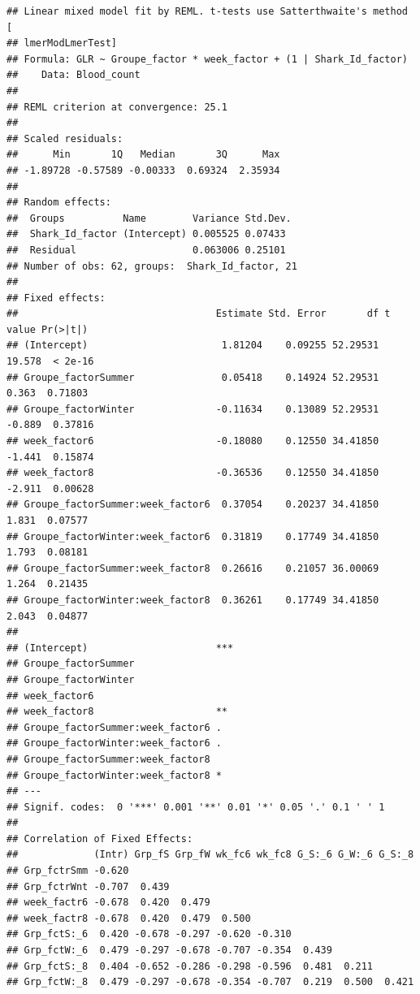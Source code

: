 \documentclass[
]{article}
\begin{document}
\begin{verbatim}
## Linear mixed model fit by REML. t-tests use Satterthwaite's method [
## lmerModLmerTest]
## Formula: GLR ~ Groupe_factor * week_factor + (1 | Shark_Id_factor)
##    Data: Blood_count
## 
## REML criterion at convergence: 25.1
## 
## Scaled residuals: 
##      Min       1Q   Median       3Q      Max 
## -1.89728 -0.57589 -0.00333  0.69324  2.35934 
## 
## Random effects:
##  Groups          Name        Variance Std.Dev.
##  Shark_Id_factor (Intercept) 0.005525 0.07433 
##  Residual                    0.063006 0.25101 
## Number of obs: 62, groups:  Shark_Id_factor, 21
## 
## Fixed effects:
##                                  Estimate Std. Error       df t value Pr(>|t|)
## (Intercept)                       1.81204    0.09255 52.29531  19.578  < 2e-16
## Groupe_factorSummer               0.05418    0.14924 52.29531   0.363  0.71803
## Groupe_factorWinter              -0.11634    0.13089 52.29531  -0.889  0.37816
## week_factor6                     -0.18080    0.12550 34.41850  -1.441  0.15874
## week_factor8                     -0.36536    0.12550 34.41850  -2.911  0.00628
## Groupe_factorSummer:week_factor6  0.37054    0.20237 34.41850   1.831  0.07577
## Groupe_factorWinter:week_factor6  0.31819    0.17749 34.41850   1.793  0.08181
## Groupe_factorSummer:week_factor8  0.26616    0.21057 36.00069   1.264  0.21435
## Groupe_factorWinter:week_factor8  0.36261    0.17749 34.41850   2.043  0.04877
##                                     
## (Intercept)                      ***
## Groupe_factorSummer                 
## Groupe_factorWinter                 
## week_factor6                        
## week_factor8                     ** 
## Groupe_factorSummer:week_factor6 .  
## Groupe_factorWinter:week_factor6 .  
## Groupe_factorSummer:week_factor8    
## Groupe_factorWinter:week_factor8 *  
## ---
## Signif. codes:  0 '***' 0.001 '**' 0.01 '*' 0.05 '.' 0.1 ' ' 1
## 
## Correlation of Fixed Effects:
##             (Intr) Grp_fS Grp_fW wk_fc6 wk_fc8 G_S:_6 G_W:_6 G_S:_8
## Grp_fctrSmm -0.620                                                 
## Grp_fctrWnt -0.707  0.439                                          
## week_factr6 -0.678  0.420  0.479                                   
## week_factr8 -0.678  0.420  0.479  0.500                            
## Grp_fctS:_6  0.420 -0.678 -0.297 -0.620 -0.310                     
## Grp_fctW:_6  0.479 -0.297 -0.678 -0.707 -0.354  0.439              
## Grp_fctS:_8  0.404 -0.652 -0.286 -0.298 -0.596  0.481  0.211       
## Grp_fctW:_8  0.479 -0.297 -0.678 -0.354 -0.707  0.219  0.500  0.421
\end{verbatim}
\end{document}

